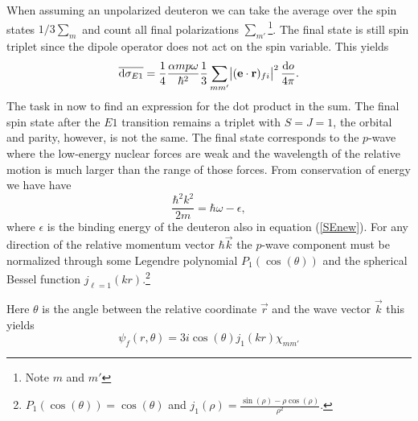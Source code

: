 When assuming an unpolarized deuteron we can take the average over the spin states $1/3 \sum_m$ and count all final polarizations $\sum_{m'}$\footnote{Note $m$ and $m'$}. The final state is still spin triplet since the dipole operator does not act on the spin variable. This yields
\begin{equation} \label{diffcross}
    \overline{\textrm{d}\sigma_{E1}} = \frac{1}{4}\frac{\alpha m p \omega}{\hbar^2} \frac{1}{3} \sum_{mm'}\abs{(\bm{\mathrm{e}}\cdot \bm{\mathrm{r}})_{fi}}^2 \frac{\textrm{d}o}{4\pi}.
\end{equation}
The task in now to find an expression for the dot product in the sum. The final spin state after the $E1$ transition remains a triplet with $S=J=1$, the orbital and parity, however, is not the same. The final state corresponds to the $p$-wave where the low-energy nuclear forces are weak and the wavelength of the relative motion is much larger than the range of those forces. From conservation of energy we have have
\begin{equation} \label{kq}
    \frac{\hbar^2 k^2}{2m} = \hbar\omega - \epsilon,
\end{equation}
where $\epsilon$ is the binding energy of the deuteron also in equation (\ref{SEnew}). For any direction of the relative momentum vector $\hbar \vec{k}$ the $p$-wave component must be normalized through some Legendre polynomial $P_1(\cos(\theta))$ and the spherical Bessel function $j_{\ell=1}(kr)$.\footnote{$P_1(\cos(\theta))=\cos(\theta)$ and $j_1(\rho)=\frac{\sin(\rho)-\rho\cos(\rho)}{\rho^2}.$}

Here $\theta$ is the angle between the relative coordinate $\vec{r}$ and the wave vector $\vec{k}$ this yields
\begin{equation}
    \psi_f(r,\theta) = 3i\cos(\theta)j_1(kr)\chi_{mm'}
\end{equation}

